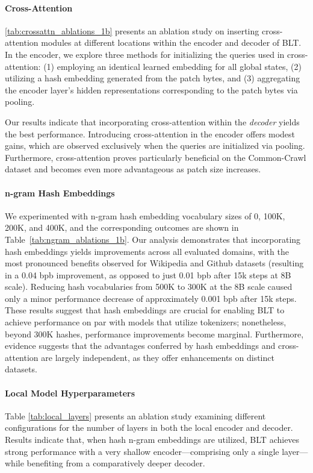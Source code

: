 \paragraph{Cross-Attention} 
\autoref{tab:crossattn_ablations_1b} presents an ablation study on inserting cross-attention modules at different locations within the encoder and decoder of {\textsc BLT}. In the encoder, we explore three methods for initializing the queries used in cross-attention: (1) employing an identical learned embedding for all global states, (2) utilizing a hash embedding generated from the patch bytes, and (3) aggregating the encoder layer's hidden representations corresponding to the patch bytes via pooling.

Our results indicate that incorporating cross-attention within the \textit{decoder} yields the best performance. Introducing cross-attention in the encoder offers modest gains, which are observed exclusively when the queries are initialized via pooling. Furthermore, cross-attention proves particularly beneficial on the Common-Crawl dataset and becomes even more advantageous as patch size increases.

\paragraph{n-gram Hash Embeddings} 

We experimented with n-gram hash embedding vocabulary sizes of 0, 100K, 200K, and 400K, and the corresponding outcomes are shown in Table~\ref{tab:ngram_ablations_1b}. Our analysis demonstrates that incorporating hash embeddings yields improvements across all evaluated domains, with the most pronounced benefits observed for Wikipedia and Github datasets (resulting in a 0.04 bpb improvement, as opposed to just 0.01 bpb after 15k steps at 8B scale). Reducing hash vocabularies from 500K to 300K at the 8B scale caused only a minor performance decrease of approximately 0.001 bpb after 15k steps. These results suggest that hash embeddings are crucial for enabling {\textsc BLT} to achieve performance on par with models that utilize tokenizers; nonetheless, beyond 300K hashes, performance improvements become marginal. Furthermore, evidence suggests that the advantages conferred by hash embeddings and cross-attention are largely independent, as they offer enhancements on distinct datasets.

\paragraph{Local Model Hyperparameters} Table \ref{tab:local_layers} presents an ablation study examining different configurations for the number of layers in both the local encoder and decoder. Results indicate that, when hash n-gram embeddings are utilized, {\textsc BLT} achieves strong performance with a very shallow encoder—comprising only a single layer—while benefiting from a comparatively deeper decoder.

